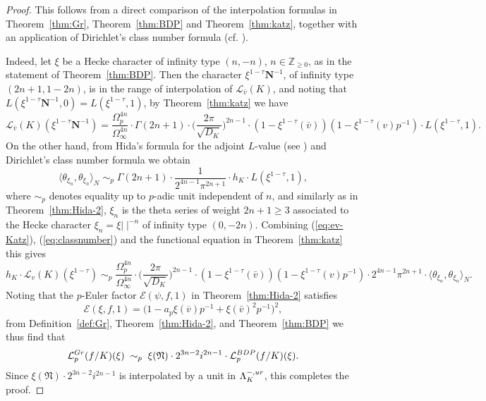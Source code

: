 \documentclass[a4paper,10pt]{amsart}
\numberwithin{equation}{section}
\numberwithin{equation}{section}
\theoremstyle{plain}
\theoremstyle{definition}
\theoremstyle{definition}
\theoremstyle{plain}
\theoremstyle{plain}
\theoremstyle{plain}
\theoremstyle{plain}
\newcommand{\Z}{\mathbb{Z}}
\newcommand{\Lcal}{\mathcal{L}}
\begin{document}
\begin{proof}
This follows from a direct comparison of the interpolation formulas in Theorem~\ref{thm:Gr}, Theorem~\ref{thm:BDP} and Theorem~\ref{thm:katz}, together with an application of Dirichlet's class number formula (cf. \cite[Thm.~1.7]{castellaheights}). 

Indeed, let $\xi$ be a Hecke character of infinity type $(n,-n)$, $n\in\Z_{\geq 0}$, as in the statement of Theorem~\ref{thm:BDP}. Then the character $\xi^{1-\tau}\mathbf{N}^{-1}$, of infinity type $(2n+1,1-2n)$, is in the range of interpolation of $\Lcal_{\bar{v}}(K)$, and noting that $L(\xi^{1-\tau}\mathbf{N}^{-1},0)=L(\xi^{1-\tau},1)$, by Theorem~\ref{thm:katz} we have
\begin{equation}\label{eq:ev-Katz}
\Lcal_{\bar{v}}(K)(\xi^{1-\tau}\mathbf{N}^{-1})=\frac{\Omega_p^{4n}}{\Omega_\infty^{4n}}\cdot\Gamma(2n+1)\cdot\biggl(\frac{2\pi}{\sqrt{D_K}}\biggr)^{2n-1}\cdot(1-\xi^{1-\tau}(\bar{v}))(1-\xi^{1-\tau}({v})p^{-1})\cdot L(\xi^{1-\tau},1).
\end{equation}
On the other hand, from Hida's formula for the adjoint $L$-value (see \cite[Thm~.7.1]{hidatilouineI}) and Dirichlet's class number formula we obtain %
\begin{equation}\label{eq:classnumber}
\langle \theta_{\xi_n},\theta_{\xi_n}\rangle_N\;\sim_p\;
\Gamma(2n+1)\cdot\frac{1}{2^{4n-1}\pi^{2n+1}}\cdot h_K\cdot L(\xi^{1-\tau},1),
\end{equation}
where $\sim_p$ denotes equality up to $p$-adic unit independent of $n$, and similarly as in Theorem~\ref{thm:Hida-2}, $\xi_n$ is the theta series of weight $2n+1\geq 3$ associated to the Hecke character $\xi_n=\xi\vert\;\vert^{-n}$ of infinity type $(0,-2n)$. Combining (\ref{eq:ev-Katz}), (\ref{eq:classnumber}) and the functional equation in Theorem~\ref{thm:katz} this gives
\[
h_K\cdot\Lcal_{v}(K)(\xi^{1-\tau})\;\sim_p\;\frac{\Omega_p^{4n}}{\Omega_\infty^{4n}}\cdot\biggl(\frac{2\pi}{\sqrt{D_K}}\biggr)^{2n-1}\cdot(1-\xi^{1-\tau}(\bar{v}))(1-\xi^{1-\tau}({v})p^{-1})\cdot 2^{4n-1}\pi^{2n+1}\cdot \langle\theta_{\xi_n},\theta_{\xi_n}\rangle_N.
\]
Noting that the $p$-Euler factor $\mathcal{E}(\psi,f,1)$ in Theorem~\ref{thm:Hida-2} satisfies
\[
\mathcal{E}(\xi,f,1)=\bigl(1-a_p\xi(\overline{v})p^{-1}+\xi(\bar{v})^2p^{-1}\bigr)^2,
\]
from Definition~\ref{def:Gr}, Theorem~\ref{thm:Hida-2}, and Theorem~\ref{thm:BDP} we thus find that
\[
\Lcal_p^{\rm Gr}(f/K)(\xi)\;\sim_p\;\xi(\mathfrak{N})\cdot 2^{3n-2}i^{2n-1}\cdot\Lcal_p^{\rm BDP}(f/K)(\xi).
\]
Since $\xi(\mathfrak{N})\cdot 2^{3n-2}i^{2n-1}$ is interpolated by a unit in $\Lambda_K^{-,\rm{ur}}$, this completes the proof.
\end{proof}
\end{document}
